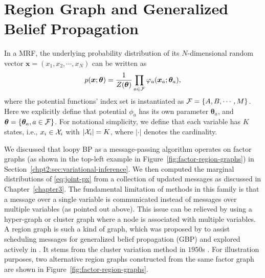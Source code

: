 \section{Region Graph and Generalized Belief Propagation}

In a MRF, the underlying probability distribution of its $N$-dimensional random vector $\bm{x}=(x_1, x_2, \cdots, x_N)$ can be written as
\begin{equation}\label{eq:joint-px}
  p(\bm{x}; \bm{\theta}) = \frac{1}{Z(\bm{\theta})} \prod_{a \in \mathcal{F}} \varphi_{a}(\bm{x}_{a}; \bm{\theta}_a),
\end{equation}
where the potential functions' index set is instantiated as $\mathcal{F} = \left\{ A, B, \cdots, M \right\}$. Here we explicitly define that potential $\phi_a$ has its own parameter $\bm{\theta}_a$, and $\bm{\theta} = \{\bm{\theta}_a, a\in \mathcal{F}\}$. For notational simplicity, we define that each variable has $K$ states, i.e., $x_i \in \mathcal{X}_i$ with $|\mathcal{X}_i|=K$, where $|\cdot|$ denotes the cardinality.

We discussed that loopy BP as a message-passing algorithm operates on factor graphs (as shown in the top-left example in Figure~\ref{fig:factor-region-graphs}) in Section~\ref{chpt2:sec:variational-inference}. We then computed the marginal distributions of \eqref{eq:joint-px} from a collection of updated messages as discussed in Chapter~\ref{chapter3}. The fundamental limitation of methods in this family is that a message over a single variable is communicated instead of messages over multiple variables (as pointed out above). This issue can be relieved by using a hyper-graph or cluster graph where a node is associated with multiple variables. A region graph is such a kind of graph, which was proposed by \cite{yedida2005constucting} to assist scheduling messages for generalized belief propagation (GBP) and explored actively in \cite{DBLP:journals/corr/abs-1207-4158, Dom_nguez_2011, Zhou_2012, Wang_2013}. It stems from the cluster variation method in $1950$s \cite{PhysRev.81.988}. For illustration purposes, two alternative region graphs constructed from the same factor graph are shown in Figure~\ref{fig:factor-region-graphs}.

